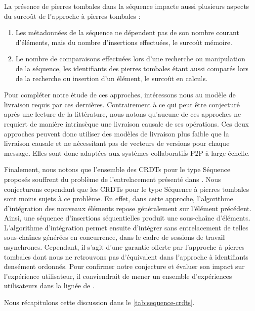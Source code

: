 La présence de pierres tombales dans la séquence impacte aussi plusieurs aspects du surcoût de l'approche à pierres tombales :
\begin{enumerate}
  \item Les métadonnées de la séquence ne dépendent pas de son nombre courant d'éléments, mais du nombre d'insertions effectuées, \ie le surcoût mémoire.
  \item Le nombre de comparaisons effectuées lors d'une recherche ou manipulation de la séquence, les identifiants des pierres tombales étant aussi comparés lors de la recherche ou insertion d'un élément, \ie le surcoût en calculs.
\end{enumerate}

Pour compléter notre étude de ces approches, intéressons nous au modèle de livraison requis par ces dernières.
Contrairement à ce qui peut être conjecturé après une lecture de la littérature, nous notons qu'aucune de ces approches ne requiert de manière intrinsèque une livraison causale de ses opérations.
Ces deux approches peuvent donc utiliser des modèles de livraison plus faible que la livraison causale et ne nécessitant pas de vecteurs de versions pour chaque message.
Elles sont donc adaptées aux systèmes collaboratifs \ac{P2P} à large échelle.

Finalement, nous notons que l'ensemble des \acp{CRDT} pour le type Séquence proposés souffrent du problème de l'entrelacement présenté dans \cite{2019-interleaving-anomalies-collaborative-editors-kleppmann}.
Nous conjecturons cependant que les \acp{CRDT} pour le type Séquence à pierres tombales sont moins sujets à ce problème.
En effet, dans cette approche, l'algorithme d'intégration des nouveaux éléments repose généralement sur l'élément précédent.
Ainsi, une séquence d'insertions séquentielles produit une sous-chaîne d'éléments.
L'algorithme d'intégration permet ensuite d'intégrer sans entrelacement de telles sous-chaînes générées en concurrence, \eg dans le cadre de sessions de travail asynchrones.
Cependant, il s'agit d'une garantie offerte par l'approche à pierres tombales dont nous ne retrouvons pas d'équivalent dans l'approche à identifiants densément ordonnés.
Pour confirmer notre conjecture et évaluer son impact sur l'expérience utilisateur, il conviendrait de mener un ensemble d'expériences utilisateurs dans la lignée de \cite{2011-evaluation-crdts-ahmed-nacer,2014-effect-delay-collaborative-editing-ignat,2015-cope-delay-collaborative-note-taking-ignat}.

Nous récapitulons cette discussion dans le \autoref{tab:sequence-crdts}.

